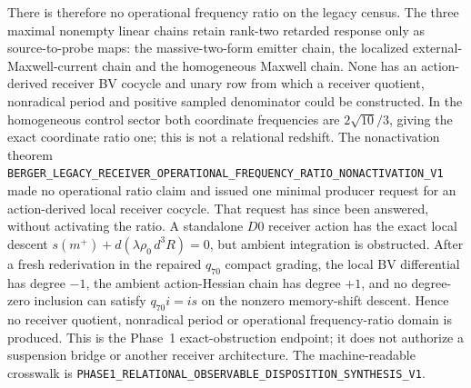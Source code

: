 \documentclass[11pt]{article}
\theoremstyle{definition}
\theoremstyle{remark}
\begin{document}
There is therefore no operational frequency ratio on the legacy census.  The
three maximal nonempty linear chains retain rank-two retarded response only as
source-to-probe maps: the massive-two-form emitter chain, the localized
external-Maxwell-current chain and the homogeneous Maxwell chain.  None has an
action-derived receiver BV cocycle and unary row from which a receiver quotient,
nonradical period and positive sampled denominator could be constructed.  In
the homogeneous control sector both coordinate frequencies are
$2\sqrt{10}/3$, giving the exact coordinate ratio one; this is not a relational
redshift.  The nonactivation theorem
\texttt{BERGER\_LEGACY\_RECEIVER\_OPERATIONAL\_FREQUENCY\_RATIO\_NONACTIVATION\_V1}
made no operational ratio claim and issued one minimal producer request for
an action-derived local receiver cocycle.  That request has since been
answered, without activating the ratio.  A standalone $D0$ receiver action
has the exact local descent
$s(m^+)+d(\lambda\rho_0\,d^3R)=0$, but ambient integration is obstructed.
After a fresh rederivation in the repaired $q_{70}$ compact grading, the
local BV differential has degree $-1$, the ambient action-Hessian chain has
degree $+1$, and no degree-zero inclusion can satisfy
$q_{70}i=i s$ on the nonzero memory-shift descent.  Hence no receiver
quotient, nonradical period or operational frequency-ratio domain is produced.
This is the Phase~1 exact-obstruction endpoint; it does not authorize a
suspension bridge or another receiver architecture.  The machine-readable
crosswalk is
\texttt{PHASE1\_RELATIONAL\_OBSERVABLE\_DISPOSITION\_SYNTHESIS\_V1}.
\end{document}
